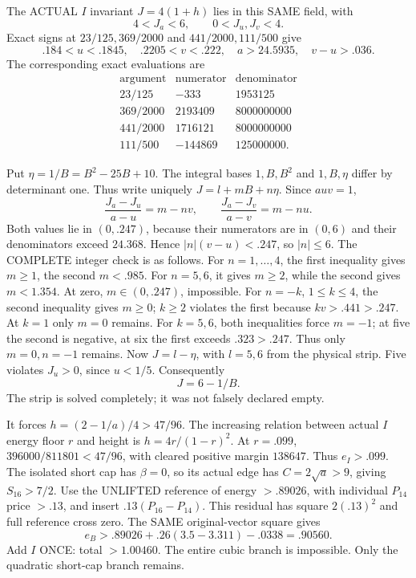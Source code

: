 \documentclass[11pt]{article}
\begin{document}
The ACTUAL \(I\) invariant \(J=4(1+h)\)
lies in this SAME field, with
\[
                           4<J_a<6,\qquad0<J_u,J_v<4 .
\]
Exact signs at \(23/125,369/2000\)
and \(441/2000,111/500\) give
\[
             .184<u<.1845,\quad .2205<v<.222,\quad
             a>24.5935,\quad v-u>.036 .
\]
The corresponding exact evaluations are
\[
\begin{array}{c|r|r}
\text{argument}&\text{numerator}&\text{denominator}\\\hline
23/125&-333&1953125\\
369/2000&2193409&8000000000\\
441/2000&1716121&8000000000\\
111/500&-144869&125000000.
\end{array}
\]

Put \(\eta=1/B=B^2-25B+10\).
The integral bases \(1,B,B^2\) and
\(1,B,\eta\) differ by determinant one.
Thus write uniquely \(J=l+mB+n\eta\).
Since \(auv=1\),
\[
             {\frac{J_a-J_u}{a-u}}=m-nv,\qquad
             {\frac{J_a-J_v}{a-v}}=m-nu .
\]
Both values lie in \((0,.247)\), because
their numerators are in \((0,6)\) and
their denominators exceed \(24.368\).
Hence \(|n|(v-u)<.247\), so \(|n|\le6\).
The COMPLETE integer check is as follows.
For \(n=1,\ldots,4\), the first inequality
gives \(m\ge1\), the second \(m<.985\).
For \(n=5,6\), it gives \(m\ge2\),
while the second gives \(m<1.354\).
At zero, \(m\in(0,.247)\), impossible.
For \(n=-k\), \(1\le k\le4\),
the second inequality gives \(m\ge0\);
\(k\ge2\) violates the first because
\(kv>.441>.247\).
At \(k=1\) only \(m=0\) remains.
For \(k=5,6\), both inequalities force
\(m=-1\); at five the second is negative,
at six the first exceeds \(.323>.247\).
Thus only \(m=0,n=-1\) remains.
Now \(J=l-\eta\), with \(l=5,6\)
from the physical strip.
Five violates \(J_u>0\), since \(u<1/5\).
Consequently
\[
                                  J=6-1/B .
\]
The strip is solved completely; it was
not falsely declared empty.

It forces \(h=(2-1/a)/4>47/96\).
The increasing relation between actual
\(I\) energy floor \(r\) and height is
\(h=4r/(1-r)^2\).
At \(r=.099\),
\(396000/811801<47/96\), with cleared
positive margin \(138647\).
Thus \(e_I>.099\).
The isolated short cap has \(\beta=0\),
so its actual edge has
\(C=2\sqrt a>9\), giving \(S_{16}>7/2\).
Use the UNLIFTED reference of energy
\(>.89026\), with individual
\(P_{14}\) price \(>.13\), and insert
\(.13(P_{16}-P_{14})\).
This residual has square \(2(.13)^2\)
and full reference cross zero.
The SAME original-vector square gives
\[
                    e_B>.89026+.26(3.5-3.311)-.0338=.90560 .
\]
Add \(I\) ONCE: total \(>1.00460\).
The entire cubic branch is impossible.
Only the quadratic short-cap branch remains.
\end{document}
